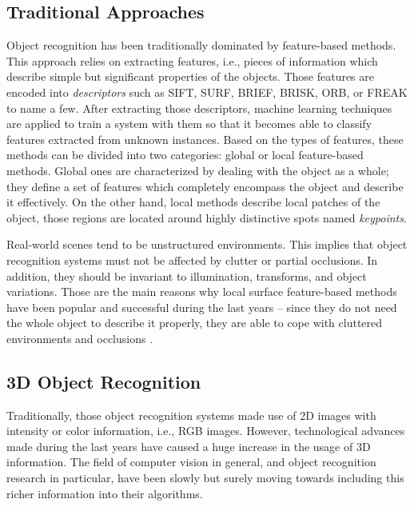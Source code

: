 \subsection{Traditional Approaches}
\label{cha:objrecog:sec:relatedworks:subsec:traditional}

Object recognition has been traditionally dominated by feature-based methods. This approach relies on extracting features, i.e., pieces of information which describe simple but significant properties of the objects. Those features are encoded into \emph{descriptors} such as \ac{SIFT}\cite{Lowe2004}, \ac{SURF}\cite{Bay2006}, \ac{BRIEF}\cite{Calonder2010}, \ac{BRISK}\cite{Leutenegger2011}, \ac{ORB}\cite{Rublee2011}, or \ac{FREAK}\cite{Alahi2012} to name a few. After extracting those descriptors, machine learning techniques are applied to train a system with them so that it becomes able to classify features extracted from unknown instances. Based on the types of features, these methods can be divided into two categories: global or local feature-based methods. Global ones are characterized by dealing with the object as a whole; they define a set of features which completely encompass the object and describe it effectively. On the other hand, local methods describe local patches of the object, those regions are located around highly distinctive spots named \emph{keypoints}. 

Real-world scenes tend to be unstructured environments. This implies that object recognition systems must not be affected by clutter or partial occlusions. In addition, they should be invariant to illumination, transforms, and object variations. Those are the main reasons why local surface feature-based methods have been popular and successful during the last years -- since they do not need the whole object to describe it properly, they are able to cope with cluttered environments and occlusions \cite{Lowe1999}. 

\subsection{3D Object Recognition}
\label{cha:objrecog:sec:relatedworks:subsec:3d}

Traditionally, those object recognition systems made use of \acs{2D} images with intensity or color information, i.e., \ac{RGB} images. However, technological advances made during the last years have caused a huge increase in the usage of \acs{3D} information. The field of computer vision in general, and object recognition research in particular, have been slowly but surely moving towards including this richer information into their algorithms.

